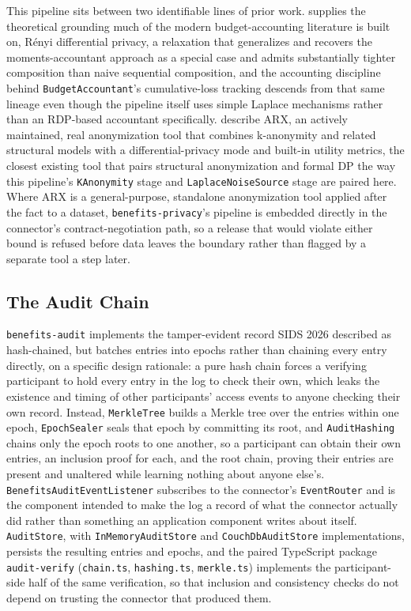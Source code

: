 This pipeline sits between two identifiable lines of prior work. \cite{mironov2017} supplies the theoretical grounding much of the modern budget-accounting literature is built on, Rényi differential privacy, a relaxation that generalizes and recovers the moments-accountant approach as a special case and admits substantially tighter composition than naive sequential composition, and the accounting discipline behind \texttt{BudgetAccountant}'s cumulative-loss tracking descends from that same lineage even though the pipeline itself uses simple Laplace mechanisms rather than an RDP-based accountant specifically. \cite{prasser2020} describe ARX, an actively maintained, real anonymization tool that combines k-anonymity and related structural models with a differential-privacy mode and built-in utility metrics, the closest existing tool that pairs structural anonymization and formal DP the way this pipeline's \texttt{KAnonymity} stage and \texttt{LaplaceNoiseSource} stage are paired here. Where ARX is a general-purpose, standalone anonymization tool applied after the fact to a dataset, \texttt{benefits-privacy}'s pipeline is embedded directly in the connector's contract-negotiation path, so a release that would violate either bound is refused before data leaves the boundary rather than flagged by a separate tool a step later.

\subsection{The Audit Chain}

\texttt{benefits-audit} implements the tamper-evident record SIDS 2026 described as hash-chained, but batches entries into epochs rather than chaining every entry directly, on a specific design rationale: a pure hash chain forces a verifying participant to hold every entry in the log to check their own, which leaks the existence and timing of other participants' access events to anyone checking their own record. Instead, \texttt{MerkleTree} builds a Merkle tree over the entries within one epoch, \texttt{EpochSealer} seals that epoch by committing its root, and \texttt{AuditHashing} chains only the epoch roots to one another, so a participant can obtain their own entries, an inclusion proof for each, and the root chain, proving their entries are present and unaltered while learning nothing about anyone else's. \texttt{BenefitsAuditEventListener} subscribes to the connector's \texttt{EventRouter} and is the component intended to make the log a record of what the connector actually did rather than something an application component writes about itself. \texttt{AuditStore}, with \texttt{InMemoryAuditStore} and \texttt{CouchDbAuditStore} implementations, persists the resulting entries and epochs, and the paired TypeScript package \texttt{audit-verify} (\texttt{chain.ts}, \texttt{hashing.ts}, \texttt{merkle.ts}) implements the participant-side half of the same verification, so that inclusion and consistency checks do not depend on trusting the connector that produced them.

